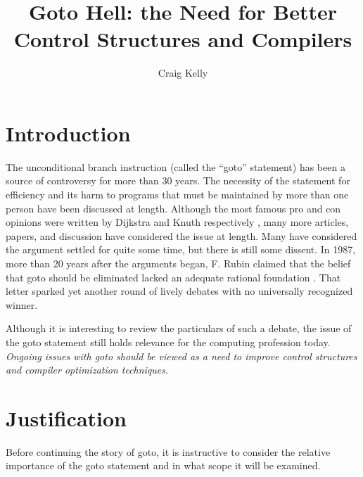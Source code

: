 \documentclass[letterpaper,10pt,twocolumn]{article}
\begin{document}
\setlength{\pdfpageheight}{\paperheight}
\setlength{\pdfpagewidth}{\paperwidth}

\title{Goto Hell: the Need for Better Control Structures and Compilers}
\author{Craig Kelly}
\maketitle


\section{Introduction}

The unconditional branch instruction (called the ``goto'' statement) has been
a source of controversy for more than 30 years.
The necessity of the statement for efficiency and its harm to programs that
must be maintained by more than one person have been discussed at length.
Although the most famous pro and con opinions were written by Dijkstra and Knuth
respectively \cite{dijkstra,knuth}, many more articles, papers, and discussion
have considered the issue at length.
Many have considered the argument settled for quite some time, but there is
still some dissent.  In 1987, more than 20 years after the arguments began,
F. Rubin claimed that the belief that goto should be eliminated lacked
an adequate rational foundation \cite{rubin}.
That letter sparked yet another round of lively debates
\cite{jonsson} with no universally recognized winner.

Although it is interesting to review the particulars of such a debate,
the issue of the goto statement still holds relevance for the computing
profession today.
\emph{Ongoing issues with goto should be viewed as a need to improve control
 structures and compiler optimization techniques.}

\section{Justification}

Before continuing the story of goto, it is instructive to consider the relative
importance of the goto statement and in what scope it will be examined.
\end{document}
